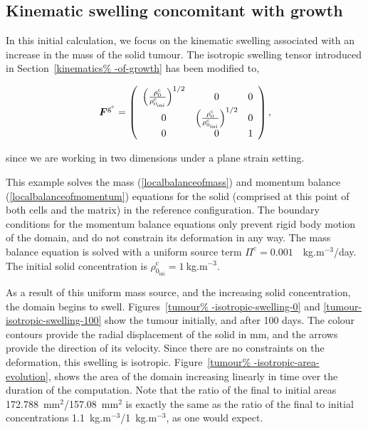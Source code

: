 \subsection{Kinematic swelling concomitant with growth}
\label{tumour-isotropic-swelling}

In this initial calculation, we focus on the kinematic swelling
associated with an increase in the mass of the solid tumour. The
isotropic swelling tensor introduced in Section~\ref{kinematics%
  -of-growth} has been modified to,

\begin{equation}
\mbox{\boldmath$ F$}^{\mathrm{g}^{\mathrm{c}}} = \left(
\begin{array}{ccc}
\left(\frac{\rho_0^{\mathrm{c}}}
     {\rho_{0_{\mathrm{ini}}}^{\mathrm{c}}}\right)^{1/2} & 0 & 0 \\ 0
     & \left(\frac{\rho_0^{\mathrm{c}}}
     {\rho_{0_{\mathrm{ini}}}^{\mathrm{c}}}\right)^{1/2} & 0 \\ 0 & 0
     & 1 \end{array} \right),
\label{2d-isotropic}
\end{equation}

\noindent since we are working in two dimensions under a plane strain
setting.

This example solves the mass (\ref{localbalanceofmass}) and momentum
balance (\ref{localbalanceofmomentum}) equations for the solid
(comprised at this point of both cells and the matrix) in the
reference configuration. The boundary conditions for the momentum
balance equations only prevent rigid body motion of the domain, and do
not constrain its deformation in any way. The mass balance equation is
solved with a uniform source term \mbox{$\Pi^{\mathrm{c}}=0.001$%
  ~kg.m$^{-3}$/day}. The initial solid concentration is
$\rho_{0_{\mathrm{ini}}}^{\mathrm{c}}=1~$kg.m$^{-3}$.

As a result of this uniform mass source, and the increasing solid
concentration, the domain begins to swell. Figures~\ref{tumour%
  -isotropic-swelling-0} and \ref{tumour-isotropic-swelling-100} show
the tumour initially, and after 100 days. The colour contours provide
the radial displacement of the solid in mm, and the arrows provide the
direction of its velocity. Since there are no constraints on the
deformation, this swelling is isotropic. Figure~\ref{tumour%
  -isotropic-area-evolution}, shows the area of the domain increasing
linearly in time over the duration of the computation. Note that the
ratio of the final to initial areas 172.788~mm$^2$/157.08~mm$^2$ is
exactly the same as the ratio of the final to initial concentrations
1.1~kg.m$^{-3}$/1~kg.m$^{-3}$, as one would expect.

